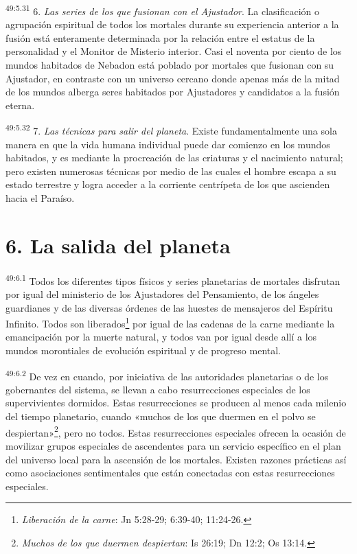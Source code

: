 \par
\textsuperscript{49:5.31} 6. \textit{Las series de los que fusionan con el Ajustador}. La clasificación o agrupación espiritual de todos los mortales durante su experiencia anterior a la fusión está enteramente determinada por la relación entre el estatus de la personalidad y el Monitor de Misterio interior. Casi el noventa por ciento de los mundos habitados de Nebadon está poblado por mortales que fusionan con su Ajustador, en contraste con un universo cercano donde apenas más de la mitad de los mundos alberga seres habitados por Ajustadores y candidatos a la fusión eterna.

\par
\textsuperscript{49:5.32} 7. \textit{Las técnicas para salir del planeta}. Existe fundamentalmente una sola manera en que la vida humana individual puede dar comienzo en los mundos habitados, y es mediante la procreación de las criaturas y el nacimiento natural; pero existen numerosas técnicas por medio de las cuales el hombre escapa a su estado terrestre y logra acceder a la corriente centrípeta de los que ascienden hacia el Paraíso.

\section*{6. La salida del planeta}
\par
\textsuperscript{49:6.1} Todos los diferentes tipos físicos y series planetarias de mortales disfrutan por igual del ministerio de los Ajustadores del Pensamiento, de los ángeles guardianes y de las diversas órdenes de las huestes de mensajeros del Espíritu Infinito. Todos son liberados\footnote{\textit{Liberación de la carne}: Jn 5:28-29; 6:39-40; 11:24-26.} por igual de las cadenas de la carne mediante la emancipación por la muerte natural, y todos van por igual desde allí a los mundos morontiales de evolución espiritual y de progreso mental.

\par
\textsuperscript{49:6.2} De vez en cuando, por iniciativa de las autoridades planetarias o de los gobernantes del sistema, se llevan a cabo resurrecciones especiales de los supervivientes dormidos. Estas resurrecciones se producen al menos cada milenio del tiempo planetario, cuando «muchos de los que duermen en el polvo se despiertan»\footnote{\textit{Muchos de los que duermen despiertan}: Is 26:19; Dn 12:2; Os 13:14.}, pero no todos. Estas resurrecciones especiales ofrecen la ocasión de movilizar grupos especiales de ascendentes para un servicio específico en el plan del universo local para la ascensión de los mortales. Existen razones prácticas así como asociaciones sentimentales que están conectadas con estas resurrecciones especiales.

